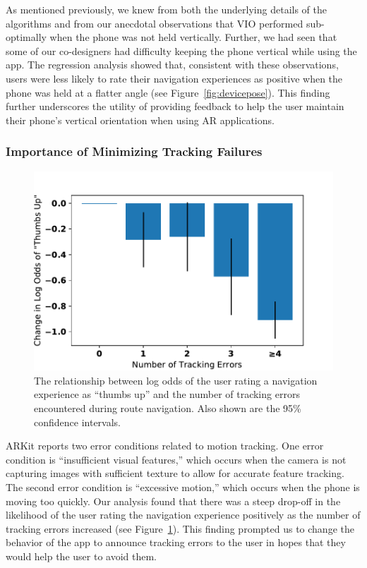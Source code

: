 \documentclass[chi_draft]{sigchi}
\begin{document}
As mentioned previously, we knew from both the underlying details of the algorithms and from our anecdotal observations that VIO performed sub-optimally when the phone was not held vertically.  Further, we had seen that some of our co-designers had difficulty keeping the phone vertical while using the app. The regression analysis showed that, consistent with these observations, users were less likely to rate their navigation experiences as positive when the phone was held at a flatter angle (see Figure~\ref{fig:devicepose}).  This finding further underscores the utility of providing feedback to help the user maintain their phone's vertical orientation when using AR applications.

\subsubsection{Importance of Minimizing Tracking Failures}
\begin{figure}
\includegraphics[width=\linewidth]{figures/trackingerrors}
\caption{The relationship between log odds of the user rating a navigation experience as ``thumbs up'' and the number of tracking errors encountered during route navigation.  Also shown are the 95\% confidence intervals.\label{fig:trackingerrors}}
\end{figure}

ARKit reports two error conditions related to motion tracking.  One error condition is ``insufficient visual features,'' which occurs when the camera is not capturing images with sufficient texture to allow for accurate feature tracking.  The second error condition is ``excessive motion,'' which occurs when the phone is moving too quickly.  Our analysis found that there was a steep drop-off in the likelihood of the user rating the navigation experience positively as the number of tracking errors increased (see Figure~\ref{fig:trackingerrors}).  This finding prompted us to change the behavior of the app to announce tracking errors to the user in hopes that they would help the user to avoid them.
\end{document}
